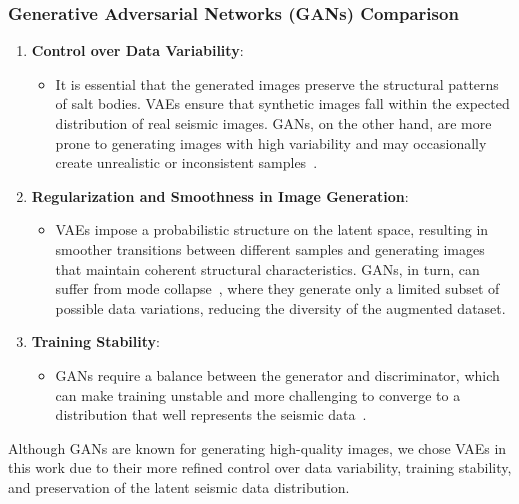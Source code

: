 \documentclass{ieeeaccess}
\begin{document}
\subsubsection{Generative Adversarial Networks (GANs) Comparison}

\begin{enumerate}
    \item \textbf{Control over Data Variability}:
    \begin{itemize}
        \item It is essential that the generated images preserve the structural patterns of salt bodies. VAEs ensure that synthetic images fall within the expected distribution of real seismic images. GANs, on the other hand, are more prone to generating images with high variability and may occasionally create unrealistic or inconsistent samples~\cite{Zhou2018}.
    \end{itemize}
    \item \textbf{Regularization and Smoothness in Image Generation}:
    \begin{itemize}
        \item VAEs impose a probabilistic structure on the latent space, resulting in smoother transitions between different samples and generating images that maintain coherent structural characteristics. GANs, in turn, can suffer from mode collapse~\cite{Zhou2018}, where they generate only a limited subset of possible data variations, reducing the diversity of the augmented dataset.
    \end{itemize}
    \item \textbf{Training Stability}:
    \begin{itemize}
        \item GANs require a balance between the generator and discriminator, which can make training unstable and more challenging to converge to a distribution that well represents the seismic data~\cite{Zhou2018}.
    \end{itemize}
\end{enumerate}

Although GANs are known for generating high-quality images, we chose VAEs in this work due to their more refined control over data variability, training stability, and preservation of the latent seismic data distribution.
\end{document}
